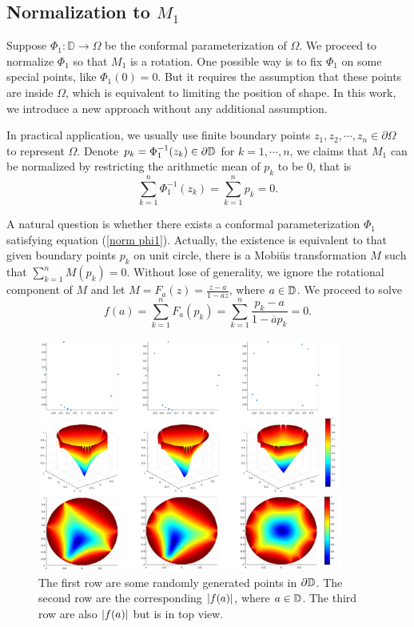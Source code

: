 \documentclass[review,onefignum,onetabnum]{siamonline190516}
\begin{document}
    \subsection{Normalization to $M_1$}\label{norm_to_m1}
    Suppose $\Phi_1:\mathbb{D}\to \Omega$ be the conformal parameterization of $\Omega$. We proceed to normalize $\Phi_1$ so that $M_1$ is a rotation. One possible way is to fix $\Phi_1$ on some special points, like $\Phi_1(0) = 0$. But it requires the assumption that these points are inside $\Omega$, which is equivalent to limiting the position of shape. In this work, we introduce a new approach without any additional assumption.
    
    In practical application, we usually use finite boundary points $z_1, z_2, \cdots, z_n \in \partial \Omega$ to represent $\Omega$. Denote $p_k = \Phi_1^{-1}(z_k) \in \partial \mathbb{D}$ for $k=1,\cdots,n$, we claims that $M_1$ can be normalized by restricting the arithmetic mean of $p_k$ to be $0$, that is
    \begin{equation}\label{norm phi1}
        \sum^n_{k=1} \Phi_1^{-1}(z_k) = \sum_{k=1}^n p_k = 0.
    \end{equation}
    
    A natural question is whether there exists a conformal parameterization $\Phi_1$ satisfying equation (\ref{norm phi1}). Actually, the existence is equivalent to that given boundary points $p_k$ on unit circle, there is a Mobi\"us transformation $M$ such that $\sum_{k=1}^n M(p_k) = 0$. Without lose of generality, we ignore the rotational component of $M$ and let $M = F_a(z) = \frac{z - a}{1 - \overline{a}z}$, where $a \in \mathbb{D}$. We proceed to solve
    \begin{equation}\label{eq}
        f(a) = \sum_{k=1}^n F_a(p_k) = \sum_{k=1}^n \frac{p_k - a}{1 - \overline{a}p_k} = 0.
    \end{equation}

    \begin{figure}
        \begin{center}
            \includegraphics[width=10cm]{fig6.png}
        \end{center}
        \caption{The first row are some randomly generated points in $\partial \mathbb{D}$. The second row are the corresponding $\left\vert f(a) \right\vert$, where $a \in \mathbb{D}$. The third row are also $\left\vert f(a) \right\vert$ but is in top view. }
        \label{fasolvable}
    \end{figure}
\end{document}
